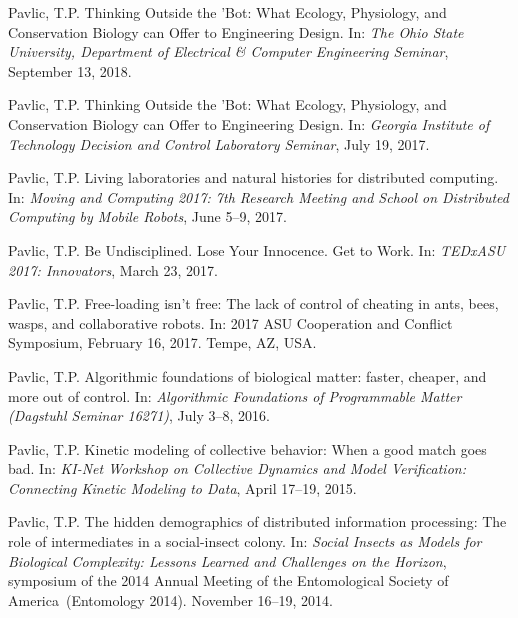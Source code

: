 \documentclass[10pt]{article}           %
\begin{document}
\begin{bibenum}
    \item Pavlic, T.P. Thinking Outside the 'Bot: What Ecology,
        Physiology, and Conservation Biology can Offer to Engineering
        Design. In: \emph{The Ohio State University, Department of
        Electrical \& Computer Engineering Seminar}, September 13, 2018.

    \item Pavlic, T.P. Thinking Outside the 'Bot: What Ecology,
        Physiology, and Conservation Biology can Offer to Engineering
        Design. In: \emph{Georgia Institute of Technology Decision and
        Control Laboratory Seminar}, July 19, 2017.

    \item Pavlic, T.P. Living laboratories and natural histories for
        distributed computing. In: \emph{Moving and Computing 2017: 7th
        Research Meeting and School on Distributed Computing by
        Mobile Robots}, June 5--9, 2017.

    \item Pavlic, T.P. Be Undisciplined. Lose Your Innocence. Get to
        Work. In: \emph{TEDxASU 2017: Innovators}, March 23, 2017.

    \item Pavlic, T.P. Free-loading isn’t free: The lack of
        control of cheating in ants, bees, wasps, and collaborative
        robots. In: 2017 ASU Cooperation and Conflict Symposium,
        February 16, 2017. Tempe, AZ, USA.

    \item Pavlic, T.P. Algorithmic foundations of biological matter:
        faster, cheaper, and more out of control. In: \emph{Algorithmic
        Foundations of Programmable Matter (Dagstuhl Seminar 16271)},
        July 3--8, 2016.

    \item Pavlic, T.P. Kinetic modeling of collective behavior: When a
        good match goes bad. In: \emph{KI-Net Workshop on Collective
        Dynamics and Model Verification: Connecting Kinetic Modeling to
        Data}, April 17--19, 2015.

    \item Pavlic, T.P.
        The hidden demographics of distributed information processing:
        The role of intermediates in a social-insect colony. In:
        \emph{Social Insects as Models for Biological Complexity:
        Lessons Learned and Challenges on the Horizon}, symposium of the
        2014 Annual Meeting of the Entomological Society of
        America~(Entomology 2014). November 16--19, 2014.


\end{bibenum}
\end{document}

